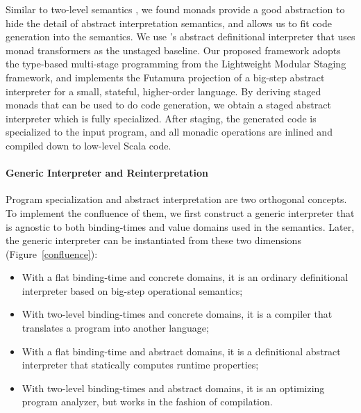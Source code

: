 Similar to two-level semantics \cite{NIELSON1989117}, we found
monads provide a good abstraction to hide the detail of abstract
interpretation semantics, and allows us to fit code generation into
the semantics. We use \citet{DBLP:journals/pacmpl/DaraisLNH17}'s
abstract definitional interpreter that uses monad transformers as the
unstaged baseline.  Our proposed framework adopts the type-based
multi-stage programming from the Lightweight Modular Staging framework,
and implements the Futamura projection of a big-step abstract
interpreter for a small, stateful, higher-order language. By deriving
staged monads that can be used to do code generation, we obtain a
staged abstract interpreter which is fully specialized. After
staging, the generated code is specialized to the input program, and
all monadic operations are inlined and compiled down to low-level
Scala code.



\paragraph{Generic Interpreter and Reinterpretation}

Program specialization and abstract interpretation are two orthogonal
concepts.  To implement the confluence of them, we first construct a
generic interpreter that is agnostic to both binding-times and value
domains used in the semantics.  Later, the generic interpreter can be
instantiated from these two dimensions (Figure~\ref{confluence}):
\begin{itemize}
\item With a flat binding-time and concrete domains, it is an ordinary
  definitional interpreter based on big-step operational semantics;
\item With two-level binding-times and concrete domains, it is a
  compiler that translates a program into another language;
\item With a flat binding-time and abstract domains, it is a
  definitional abstract interpreter \cite{DBLP:journals/pacmpl/DaraisLNH17}
  that statically computes runtime properties;
\item With two-level binding-times and abstract domains, it is an optimizing
  program analyzer, but works in the fashion of compilation.
\end{itemize}

